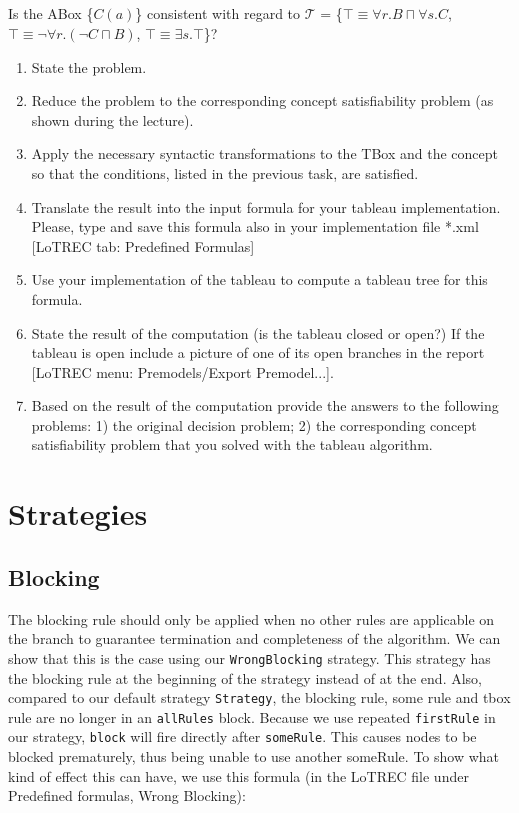 \documentclass[11pt]{article} %
\begin{document}
\subsection{}

\begin{center}
Is the ABox \{$C(a)$\} consistent with regard to $\mathcal{T}$ = \{$\top \equiv \forall r.B \sqcap \forall s.C$, $\top \equiv \neg \forall r.(\neg C \sqcap B)$, $\top \equiv \exists s.\top$\}?
\end{center}

\begin{enumerate}
\item State the problem.
\item Reduce the problem to the corresponding concept satisfiability problem (as shown during the lecture).
\item Apply the necessary syntactic transformations to the TBox and the concept so that the conditions, listed in the previous task, are satisfied.
\item Translate the result into the input formula for your tableau implementation. Please, type and save this formula also in your implementation file *.xml [LoTREC tab: Predefined Formulas]
\item Use your implementation of the tableau to compute a tableau tree for this formula.
\item State the result of the computation (is the tableau closed or open?) If the tableau is open include a picture of one of its open branches in the report [LoTREC menu: Premodels/Export Premodel...].
\item Based on the result of the computation provide the answers to the following problems: 1) the original decision problem; 2) the corresponding concept satisfiability problem that you solved with the tableau algorithm.
\end{enumerate}

\section{Strategies}
\label{sec:strategies}

\subsection{Blocking}

The blocking rule should only be applied when no other rules are applicable on the branch to guarantee termination and completeness of the algorithm. We can show that this is the case using our \texttt{WrongBlocking} strategy. This strategy has the blocking rule at the beginning of the strategy instead of at the end. Also, compared to our default strategy \texttt{Strategy}, the blocking rule, some rule and tbox rule are no longer in an \texttt{allRules} block. Because we use repeated \texttt{firstRule} in our strategy, \texttt{block} will fire directly after \texttt{someRule}. This causes nodes to be blocked prematurely, thus being unable to use another someRule. To show what kind of effect this can have, we use this formula (in the LoTREC file under Predefined formulas, Wrong Blocking):
\end{document}
